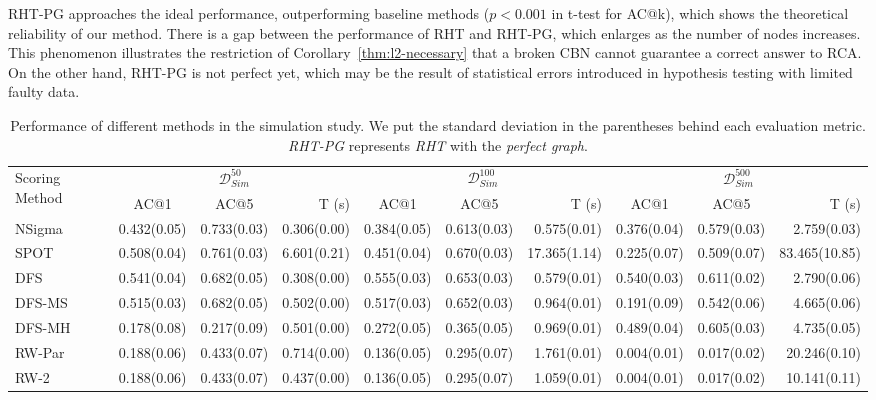 RHT-PG approaches the ideal performance, outperforming baseline methods ($p < 0.001$ in t-test for AC@k), which shows the theoretical reliability of our method.
There is a gap between the performance of RHT and RHT-PG, which enlarges as the number of nodes increases.
This phenomenon illustrates the restriction of Corollary~\ref{thm:l2-necessary} that a broken CBN cannot guarantee a correct answer to RCA.
On the other hand, RHT-PG is not perfect yet, which may be the result of statistical errors introduced in hypothesis testing with limited faulty data.

\begin{table}[tb]
	\caption{
	    Performance of different methods in the simulation study. We put the standard deviation in the parentheses behind each evaluation metric.
	    \textit{RHT-PG} represents \textit{RHT} with the \textit{perfect graph}.
	}\label{tab:performance:sim}
	\begin{tabular}{l ccr ccr ccr}
		\toprule
		\multirow{2}{0.15\columnwidth}{Scoring Method} & \multicolumn{3}{c}{$\mathcal{D}_{Sim}^{50}$} & \multicolumn{3}{c}{$\mathcal{D}_{Sim}^{100}$} & \multicolumn{3}{c}{$\mathcal{D}_{Sim}^{500}$} \\
		& AC@1 & AC@5 & \multirow{1}{0.12\columnwidth}{T (s)} & AC@1 & AC@5 & \multirow{1}{0.12\columnwidth}{T (s)} & AC@1 & AC@5 & \multirow{1}{0.12\columnwidth}{T (s)} \\ 
		\midrule
		NSigma & 0.432(0.05) & 0.733(0.03) & 0.306(0.00) & 0.384(0.05) & 0.613(0.03) & 0.575(0.01) & 0.376(0.04) & 0.579(0.03) & 2.759(0.03) \\
		SPOT & 0.508(0.04) & 0.761(0.03) & 6.601(0.21) & 0.451(0.04) & 0.670(0.03) & 17.365(1.14) & 0.225(0.07) & 0.509(0.07) & 83.465(10.85) \\
		DFS & 0.541(0.04) & 0.682(0.05) & 0.308(0.00) & 0.555(0.03) & 0.653(0.03) & 0.579(0.01) & 0.540(0.03) & 0.611(0.02) & 2.790(0.06) \\
		DFS-MS & 0.515(0.03) & 0.682(0.05) & 0.502(0.00) & 0.517(0.03) & 0.652(0.03) & 0.964(0.01) & 0.191(0.09) & 0.542(0.06) & 4.665(0.06) \\
		DFS-MH & 0.178(0.08) & 0.217(0.09) & 0.501(0.00) & 0.272(0.05) & 0.365(0.05) & 0.969(0.01) & 0.489(0.04) & 0.605(0.03) & 4.735(0.05) \\
		RW-Par & 0.188(0.06) & 0.433(0.07) & 0.714(0.00) & 0.136(0.05) & 0.295(0.07) & 1.761(0.01) & 0.004(0.01) & 0.017(0.02) & 20.246(0.10) \\
		RW-2\footnotemark & 0.188(0.06) & 0.433(0.07) & 0.437(0.00) & 0.136(0.05) & 0.295(0.07) & 1.059(0.01) & 0.004(0.01) & 0.017(0.02) & 10.141(0.11) \\

\end{tabular}
\end{table}
